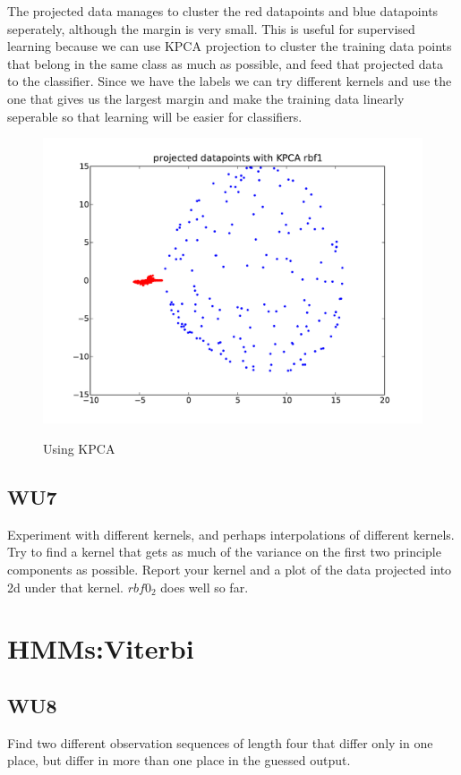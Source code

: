 \documentclass[a4paper,11pt]{article}
\begin{document}
The projected data manages to cluster the red datapoints and blue
datapoints seperately, although the margin is very small. 
This is useful for supervised learning because we can use KPCA
projection to cluster the training data
points that belong in the same class as much as possible, and feed
that projected data to the classifier.
Since we have the labels we can try different kernels and use the one
that gives us the largest margin and make the training data linearly
seperable so that learning will be easier for classifiers.
\begin{figure}[!ht]
  \begin{center}
  \caption{Using KPCA}
  \includegraphics[width=4.5in]{WU6.pdf}
  \label{figures:wu61}
  \end{center}
\end{figure}

\subsection{WU7}
\textsf{Experiment with different kernels, and perhaps interpolations 
of different kernels. Try to find a kernel that gets as much of the 
variance on the first two principle components as possible. Report your 
kernel and a plot of the data projected into 2d under that kernel.}\vspace{0.1in}
$rbf0_2$ does well so far.
\pagebreak
\section{HMMs:Viterbi}
\subsection{WU8}
\textsf{Find two different observation sequences of length four that
differ only in one place, but differ in more than one place in the
guessed output.}\vspace{0.1in}
\end{document}
